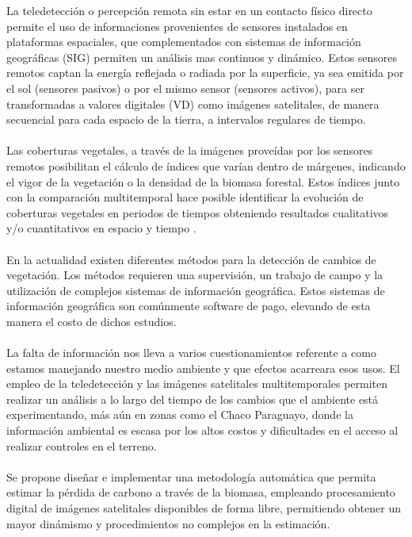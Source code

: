 La teledetecci\'on o percepci\'on remota sin estar en un contacto f\'isico directo permite el uso de informaciones provenientes de sensores instalados en plataformas espaciales, que complementados con sistemas de informaci\'on geogr\'aficas (SIG) permiten un an\'alisis mas continuos y din\'amico. Estos sensores remotos captan la energ\'ia reflejada o radiada por la superficie, ya sea emitida por el sol (sensores pasivos) o por el mismo sensor (sensores activos), para ser transformadas a valores digitales (VD) como im\'agenes satelitales, de manera secuencial para cada espacio de la tierra, a intervalos regulares de tiempo.\\~\\
Las coberturas vegetales, a trav\'es de la im\'agenes prove\'idas por los sensores remotos posibilitan el c\'alculo de \'indices que var\'ian dentro de m\'argenes, indicando el vigor de la vegetaci\'on o la densidad de la biomasa forestal. Estos \'indices junto con la comparaci\'on multitemporal hace posible identificar la evoluci\'on de coberturas vegetales en periodos de tiempos obteniendo resultados cualitativos y/o cuantitativos en espacio y tiempo \cite{martinez2013normalizacion}.\\~\\
En la actualidad existen diferentes m\'etodos para la detecci\'on de cambios de vegetaci\'on. Los m\'etodos requieren una supervisi\'on, un trabajo de campo y la utilizaci\'on de complejos sistemas de informaci\'on geogr\'afica. Estos sistemas de informaci\'on geogr\'afica son com\'unmente software de pago, elevando de esta manera el costo de dichos estudios. \\~\\
La falta de informaci\'on nos lleva a varios cuestionamientos referente a como estamos manejando nuestro medio ambiente y que efectos acarreara esos usos. El empleo de la teledetecci\'on y las im\'agenes satelitales multitemporales permiten realizar un an\'alisis a lo largo del tiempo de los cambios que el ambiente est\'a experimentando, m\'as a\'un en zonas como el Chaco Paraguayo, donde la informaci\'on ambiental es escasa por los altos costos y dificultades en el acceso al realizar controles en el terreno.\\~\\
Se propone dise\~{n}ar e implementar una metodolog\'ia autom\'atica que permita estimar la p\'erdida de carbono a trav\'es de la biomasa, empleando procesamiento digital de im\'agenes satelitales disponibles de forma libre, permitiendo obtener un mayor din\'amismo y procedimientos no complejos en la estimaci\'on.

